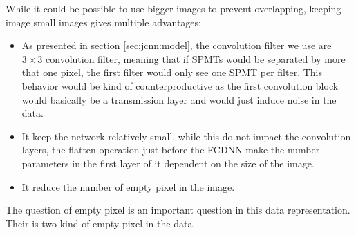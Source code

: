 While it could be possible to use bigger images to prevent overlapping, keeping image small images gives multiple advantages:
\begin{itemize}
  \item As presented in section \ref{sec:jcnn:model}, the convolution filter we use are $3 \times 3$ convolution filter, meaning that if SPMTs would be separated by more that one pixel, the first filter would only see one SPMT per filter. This behavior would be kind of counterproductive as the first convolution block would basically be a transmission layer and would just induce noise in the data.
  \item It keep the network relatively small, while this do not impact the convolution layers, the flatten operation just before the FCDNN make the number parameters in the first layer of it dependent on the size of the image.
  \item It reduce the number of empty pixel in the image.
\end{itemize}
The question of empty pixel is an important question in this data representation. Their is two kind of empty pixel in the data.


